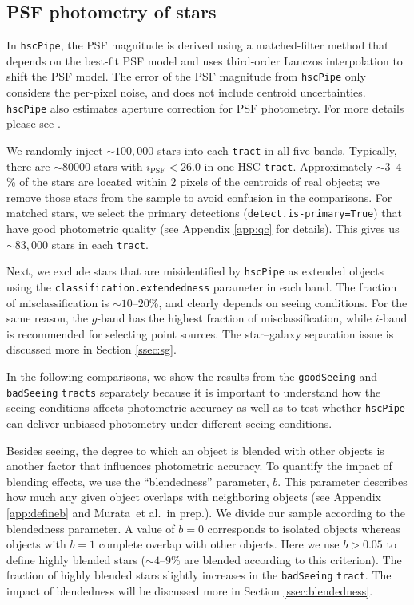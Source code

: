 \documentclass[useamsfonts]{pasj01}
\def\etal{{\ et al.~}}
\def\hscpipe{\texttt{hscPipe}}
\def\tract{\texttt{tract}}
\def\tracts{\texttt{tracts}}
\begin{document}
\subsection{PSF photometry of stars}
    \label{ssec:psf}

    In \hscpipe{}, the PSF magnitude is derived using a matched-filter method that
    depends on the best-fit PSF model and uses third-order Lanczos interpolation to 
    shift the PSF model.
    The error of the PSF magnitude from \hscpipe{} only considers the per-pixel noise,
    and does not include centroid uncertainties.
    \hscpipe{} also estimates aperture correction for PSF photometry.
    For more details please see \citet{Bosch2017}.

    We randomly inject ${\sim}100,000$ stars into each \tract{} in all five bands. 
    Typically, there are ${\sim}80000$ stars with $i_{\mathrm{PSF}}<26.0$ in one HSC 
    \tract{}. 
    Approximately ${\sim}3$--$4$\% of the stars are located within 2 pixels of the 
    centroids of real objects; we remove those stars from the sample to avoid
    confusion in the comparisons.
    For matched stars, we select the primary detections 
    (\texttt{detect.is-primary=True}) that have good photometric quality
    (see Appendix \ref{app:qc} for details).
    This gives us ${\sim}83,000$ stars in each \tract{}.

    Next, we exclude stars that are misidentified by \hscpipe{} as extended
    objects using the \texttt{classification.extendedness} parameter in each band.
    The fraction of misclassification is ${\sim}10$--$20$\%, and clearly depends on
    seeing conditions.
    For the same reason, the $g$-band has the highest fraction of misclassification,
    while $i$-band is recommended for selecting point sources.
    The star--galaxy separation issue is discussed more in Section \ref{ssec:sg}.

    In the following comparisons, we show the results from the
    \texttt{goodSeeing} and \texttt{badSeeing} \tracts{} separately because it
    is important to understand how the seeing conditions affects photometric accuracy 
    as well as to test whether \hscpipe{} can deliver unbiased photometry under 
    different seeing conditions.
    
    Besides seeing, the degree to which an object is blended with other objects 
    is another factor that influences photometric accuracy. 
    To quantify the impact of blending effects, we use the ``blendedness'' 
    parameter, $b$. 
    This parameter describes how much any given object overlaps with neighboring 
    objects (see Appendix \ref{app:defineb} and Murata\etal in prep.). 
    We divide our sample according to the blendedness parameter. 
    A value of $b=0$ corresponds to isolated objects whereas objects with $b=1$ 
    complete overlap with other objects. 
    Here we use $b>0.05$ to define highly blended stars (${\sim}4$--$9$\% are blended
    according to this criterion).
    The fraction of highly blended stars slightly increases in the \texttt{badSeeing} 
    \tract{}. 
    The impact of blendedness will be discussed more in Section \ref{ssec:blendedness}.
\end{document}
